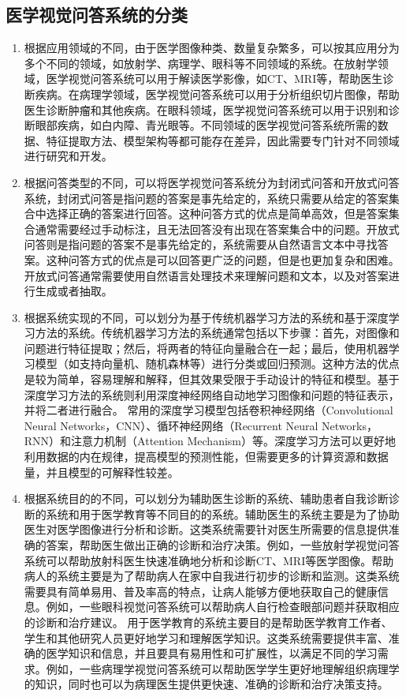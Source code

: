 \subsection{医学视觉问答系统的分类}
\begin{enumerate}[topsep = 0 pt, itemsep= 0 pt, parsep=0pt, partopsep=0pt, leftmargin=44pt, itemindent=0pt, labelsep=6pt, label=(\arabic*)]
    \item 根据应用领域的不同，由于医学图像种类、数量复杂繁多，可以按其应用分为多个不同的领域，如放射学、病理学、眼科等不同领域的系统。在放射学领域，医学视觉问答系统可以用于解读医学影像，如CT、MRI等，帮助医生诊断疾病。在病理学领域，医学视觉问答系统可以用于分析组织切片图像，帮助医生诊断肿瘤和其他疾病。在眼科领域，医学视觉问答系统可以用于识别和诊断眼部疾病，如白内障、青光眼等。不同领域的医学视觉问答系统所需的数据、特征提取方法、模型架构等都可能存在差异，因此需要专门针对不同领域进行研究和开发。
    \item 根据问答类型的不同，可以将医学视觉问答系统分为封闭式问答和开放式问答系统，封闭式问答是指问题的答案是事先给定的，系统只需要从给定的答案集合中选择正确的答案进行回答。这种问答方式的优点是简单高效，但是答案集合通常需要经过手动标注，且无法回答没有出现在答案集合中的问题。开放式问答则是指问题的答案不是事先给定的，系统需要从自然语言文本中寻找答案。这种问答方式的优点是可以回答更广泛的问题，但是也更加复杂和困难。开放式问答通常需要使用自然语言处理技术来理解问题和文本，以及对答案进行生成或者抽取。
    \item 根据系统实现的不同，可以划分为基于传统机器学习方法的系统和基于深度学习方法的系统。传统机器学习方法的系统通常包括以下步骤：首先，对图像和问题进行特征提取；然后，将两者的特征向量融合在一起；最后，使用机器学习模型（如支持向量机、随机森林等）进行分类或回归预测。这种方法的优点是较为简单，容易理解和解释，但其效果受限于手动设计的特征和模型。基于深度学习方法的系统则利用深度神经网络自动地学习图像和问题的特征表示，并将二者进行融合。
    常用的深度学习模型包括卷积神经网络（Convolutional Neural Networks，CNN）、循环神经网络（Recurrent Neural Networks，RNN）和注意力机制（Attention Mechanism）等。深度学习方法可以更好地利用数据的内在规律，提高模型的预测性能，但需要更多的计算资源和数据量，并且模型的可解释性较差。
    \item 根据系统目的的不同，可以划分为辅助医生诊断的系统、辅助患者自我诊断诊断的系统和用于医学教育等不同目的的系统。辅助医生的系统主要是为了协助医生对医学图像进行分析和诊断。这类系统需要针对医生所需要的信息提供准确的答案，帮助医生做出正确的诊断和治疗决策。例如，一些放射学视觉问答系统可以帮助放射科医生快速准确地分析和诊断CT、MRI等医学图像。帮助病人的系统主要是为了帮助病人在家中自我进行初步的诊断和监测。这类系统需要具有简单易用、普及率高的特点，让病人能够方便地获取自己的健康信息。例如，一些眼科视觉问答系统可以帮助病人自行检查眼部问题并获取相应的诊断和治疗建议。
    用于医学教育的系统主要目的是帮助医学教育工作者、学生和其他研究人员更好地学习和理解医学知识。这类系统需要提供丰富、准确的医学知识和信息，并且要具有易用性和可扩展性，以满足不同的学习需求。例如，一些病理学视觉问答系统可以帮助医学学生更好地理解组织病理学的知识，同时也可以为病理医生提供更快速、准确的诊断和治疗决策支持。
\end{enumerate}


